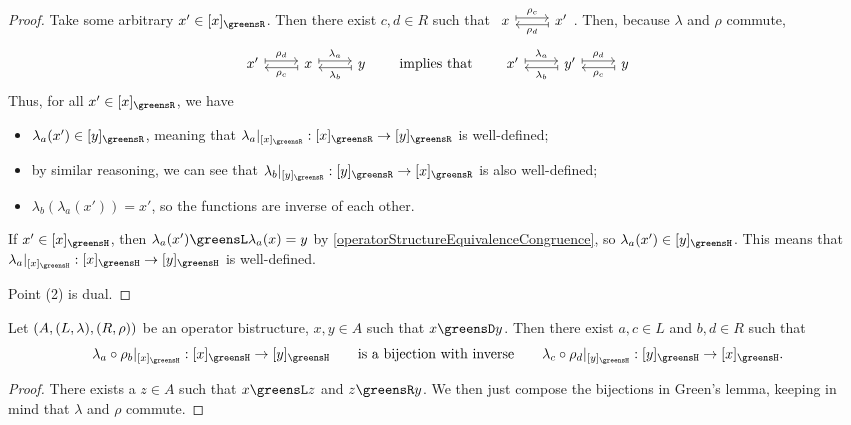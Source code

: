 \begin{proof}
Take some arbitrary $x'\in [x]_\greensR$. Then there exist $c,d\in R$ such that $\begin{tikzcd}
x \ar[r, maps to, shift left, "\rho_c"] & x' \ar[l, maps to, shift left, "\rho_d"]
\end{tikzcd}$. Then, because $\lambda$ and $\rho$ commute,
\[ \begin{tikzcd}
x' \ar[r, maps to, shift left, "\rho_d"] & x \ar[l, maps to, shift left, "\rho_c"] \ar[r, maps to, shift left, "\lambda_a"] & y \ar[l, maps to, shift left, "\lambda_b"]
\end{tikzcd} \qquad\text{implies that} \qquad \begin{tikzcd}
x' \ar[r, maps to, shift left, "\lambda_a"] & y' \ar[l, maps to, shift left, "\lambda_b"] \ar[r, maps to, shift left, "\rho_d"] & y \ar[l, maps to, shift left, "\rho_c"]
\end{tikzcd} \]
Thus, for all $x'\in [x]_\greensR$, we have
\begin{itemize}
\item $\lambda_a(x') \in [y]_\greensR$, meaning that $\lambda_a|_{[x]_\greensR}: [x]_\greensR \to [y]_\greensR$ is well-defined;
\item by similar reasoning, we can see that $\lambda_b|_{[y]_\greensR}: [y]_\greensR \to [x]_\greensR$ is also well-defined;
\item $\lambda_b(\lambda_a(x')) = x'$, so the functions are inverse of each other.
\end{itemize}
If $x'\in [x]_\greensH$, then $\lambda_a(x')\greensL \lambda_a(x) = y$ by \ref{operatorStructureEquivalenceCongruence}, so $\lambda_a(x')\in [y]_\greensH$. This means that $\lambda_a|_{[x]_\greensH}: [x]_\greensH \to [y]_\greensH$ is well-defined.

Point (2) is dual.
\end{proof}
\begin{corollary} \label{greensDisomorphism}
Let $\left( A, (L, \lambda), (R,\rho) \right)$ be an operator bistructure, $x, y\in A$ such that $x\greensD y$. Then there exist $a,c\in L$ and $b,d\in R$ such that
\[ \lambda_a\circ\rho_b|_{[x]_\greensH}: [x]_\greensH \to [y]_\greensH \qquad \text{is a bijection with inverse} \qquad \lambda_c\circ \rho_d|_{[y]_\greensH}: [y]_\greensH \to [x]_\greensH. \]
\end{corollary}
\begin{proof}
There exists a $z\in A$ such that $x\greensL z$ and $z\greensR y$. We then just compose the bijections in Green's lemma, keeping in mind that $\lambda$ and $\rho$ commute.
\end{proof}

